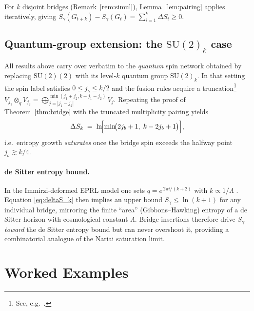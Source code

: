 \documentclass[11pt]{article}
\newcommand{\SU}{\mathrm{SU}(2)}
\newcommand{\Cut}{\gamma}
\begin{document}
\begin{remark}\label{rem:multiBridge} For $k$ disjoint bridges (Remark~\ref{rem:simul}), Lemma~\ref{lem:pairing} applies iteratively, giving $S_{\Cut}(G_{t+k})-S_{\Cut}(G_t)=\sum_{i=1}^{k}\Delta S_i\ge0$. \end{remark}



\subsection{Quantum-group extension: the \texorpdfstring{$\mathrm{SU}(2)_k$}{SU(2)\_k} case}
\label{subsec:qgroup}

All results above carry over verbatim to the
\emph{quantum} spin network obtained by replacing
$\SU(2)$ with its level-$k$ quantum
group $\mathrm{SU}(2)_k$.  In that setting the spin label satisfies
$0 \le j_b \le k/2$ and the fusion rules acquire a
truncation\footnote{See, e.g.\ 
\cite[Sect.~4]{Freidel2005}.}  
$V_{j_1}\otimes_q V_{j_2}
 = \bigoplus_{j=|j_1-j_2|}^{\min(j_1+j_2,k-j_1-j_2)} V_j$.
Repeating the proof of Theorem~\ref{thm:bridge} with the
truncated multiplicity pairing yields
\begin{equation}
  \Delta S_k
  \;=\;
  \ln\!\Bigl[\min\!\bigl(2j_b+1,\;k-2j_b+1\bigr)\Bigr],
  \label{eq:deltaS_k}
\end{equation}
i.e.\ entropy growth \emph{saturates} once the bridge spin
exceeds the halfway point $j_b \gtrsim k/4$.

\paragraph{de Sitter entropy bound.}
In the Immirzi-deformed EPRL model one sets
$q = e^{\,2\pi i/(k+2)}$ with
$k \propto 1/\Lambda$ \cite{RovelliVidotto2014}.  
Equation \eqref{eq:deltaS_k} then implies an upper bound
$S_\gamma \le \ln(k+1)$ for any individual bridge,
mirroring the finite “area” (Gibbons–Hawking) entropy of a
de Sitter horizon with cosmological constant $\Lambda$.
Bridge insertions therefore drive $S_\gamma$ \emph{toward} the de Sitter
entropy bound but can never overshoot it, providing a
combinatorial analogue of the Nariai saturation limit.


\section{Worked Examples}
\end{document}

